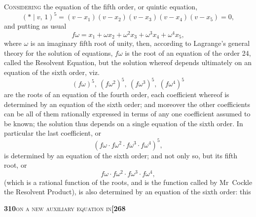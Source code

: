 \documentclass[11pt]{article}
\newcommand{\Cdel}{\mid}
\begin{document}
\noindent\textsc{Considering} the equation of the fifth order, or quintic equation,
\[
   (*\Cdel v,\,1)^5 = (v - x_1)(v - x_2)(v - x_3)(v - x_4)(v - x_5) = 0,
\]
and putting as usual
\[
   f\omega = x_1 + \omega x_2 + \omega^2 x_3 + \omega^3 x_4 + \omega^4 x_5,
\]
where $\omega$ is an imaginary fifth root of unity, then, according to Lagrange's general theory for the solution of equations, $f\omega$ is the root of an equation of the order 24, called the Resolvent Equation, but the solution whereof depends ultimately on an equation of the sixth order, viz.
\[
   (f\omega)^5,\ (f\omega^2)^5,\ (f\omega^3)^5,\ (f\omega^4)^5
\]
are the roots of an equation of the fourth order, each coefficient whereof is determined by an equation of the sixth order; and moreover the other coefficients can be all of them rationally expressed in terms of any one coefficient assumed to be known; the solution thus depends on a single equation of the sixth order. In particular the last coefficient, or
\[
   (f\omega\cdot f\omega^2\cdot f\omega^3\cdot f\omega^4)^5,
\]
is determined by an equation of the sixth order; and not only so, but its fifth root, or
\[
   f\omega\cdot f\omega^2\cdot f\omega^3\cdot f\omega^4,
\]
(which is a rational function of the roots, and is the function called by Mr~Cockle the Resolvent Product), is also determined by an equation of the sixth order: this

\newpage
\setcounter{page}{310}

\noindent\textbf{310}\hfill\textsc{on a new auxiliary equation in}\hfill\textbf{[268}

\medskip
\end{document}
